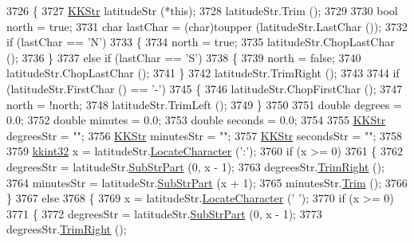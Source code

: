 \begin{DoxyCode}
3726 \{
3727   \hyperlink{class_k_k_b_1_1_k_k_str}{KKStr} latitudeStr (*\textcolor{keyword}{this});
3728   latitudeStr.Trim ();
3729 
3730   \textcolor{keywordtype}{bool}  north = \textcolor{keyword}{true};
3731   \textcolor{keywordtype}{char}  lastChar = (char)toupper (latitudeStr.LastChar ());
3732   \textcolor{keywordflow}{if}  (lastChar == \textcolor{charliteral}{'N'})
3733   \{
3734     north = \textcolor{keyword}{true};
3735     latitudeStr.ChopLastChar ();
3736   \}
3737   \textcolor{keywordflow}{else} \textcolor{keywordflow}{if}  (lastChar == \textcolor{charliteral}{'S'})
3738   \{
3739     north = \textcolor{keyword}{false};
3740     latitudeStr.ChopLastChar ();
3741   \}
3742   latitudeStr.TrimRight ();
3743 
3744   \textcolor{keywordflow}{if}  (latitudeStr.FirstChar () == \textcolor{charliteral}{'-'})
3745   \{
3746     latitudeStr.ChopFirstChar ();
3747     north = !north;
3748     latitudeStr.TrimLeft ();
3749   \}
3750 
3751   \textcolor{keywordtype}{double}  degrees = 0.0;
3752   \textcolor{keywordtype}{double}  minutes = 0.0;
3753   \textcolor{keywordtype}{double}  seconds = 0.0;
3754 
3755   \hyperlink{class_k_k_b_1_1_k_k_str}{KKStr}  degreesStr = \textcolor{stringliteral}{""};
3756   \hyperlink{class_k_k_b_1_1_k_k_str}{KKStr}  minutesStr = \textcolor{stringliteral}{""};
3757   \hyperlink{class_k_k_b_1_1_k_k_str}{KKStr}  secondsStr  = \textcolor{stringliteral}{""};
3758 
3759   \hyperlink{namespace_k_k_b_a8fa4952cc84fda1de4bec1fbdd8d5b1b}{kkint32}  x = latitudeStr.\hyperlink{class_k_k_b_1_1_k_k_str_ad738b238e609887bbf27841f359046cd}{LocateCharacter} (\textcolor{charliteral}{':'});
3760   \textcolor{keywordflow}{if}  (x >= 0)
3761   \{
3762     degreesStr = latitudeStr.\hyperlink{class_k_k_b_1_1_k_k_str_a5f20b2ddfc9f07c8ef99592810332ddb}{SubStrPart} (0, x - 1);
3763     degreesStr.\hyperlink{class_k_k_b_1_1_k_k_str_aa912161f17871e2d6fec7bbac033221c}{TrimRight} ();
3764     minutesStr = latitudeStr.\hyperlink{class_k_k_b_1_1_k_k_str_a5f20b2ddfc9f07c8ef99592810332ddb}{SubStrPart} (x + 1);
3765     minutesStr.\hyperlink{class_k_k_b_1_1_k_k_str_aa7fb03387fd7fabca05fba28271b7c20}{Trim} ();
3766   \}
3767   \textcolor{keywordflow}{else}
3768   \{
3769     x = latitudeStr.\hyperlink{class_k_k_b_1_1_k_k_str_ad738b238e609887bbf27841f359046cd}{LocateCharacter} (\textcolor{charliteral}{' '});
3770     \textcolor{keywordflow}{if}  (x >= 0)
3771     \{
3772       degreesStr = latitudeStr.\hyperlink{class_k_k_b_1_1_k_k_str_a5f20b2ddfc9f07c8ef99592810332ddb}{SubStrPart} (0, x - 1);
3773       degreesStr.\hyperlink{class_k_k_b_1_1_k_k_str_aa912161f17871e2d6fec7bbac033221c}{TrimRight} ();

\end{DoxyCode}
